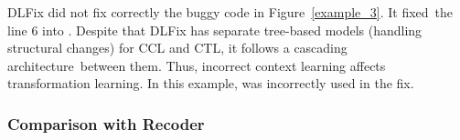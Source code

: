 
DLFix did not fix correctly the buggy code in
Figure~\ref{example_3}. It fixed~the line 6 into    \code{\%}
. Despite that DLFix has separate tree-based models
(handling structural changes) for CCL and CTL,
it follows a cascading architecture~between them.
Thus, incorrect context learning affects transformation
learning. In this example,  was incorrectly used in the
fix.














\subsubsection{\bf Comparison with Recoder}

